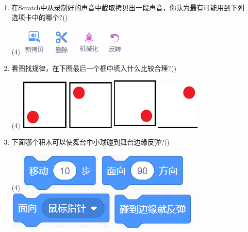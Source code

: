 \documentclass[10pt, a4paper]{article}
\begin{document}
\begin{enumerate}
        \item 在Scratch中从录制好的声音中截取拷贝出一段声音，你认为最有可能用到下列选项卡中的哪个?(\qquad)
        \begin{tasks}(4)
            \task \includegraphics[width=.04\textwidth]{21a.png}
            \task \includegraphics[width=.04\textwidth]{21b.png}
            \task \includegraphics[width=.04\textwidth]{21c.png}
            \task \includegraphics[width=.04\textwidth]{21d.png}
        \end{tasks}

        \item 看图找规律，在下图最后一个框中填入什么比较合理?(\qquad)
        \begin{tasks}(4)
            \task \includegraphics[width=.05\textwidth]{22a.png}
            \task \includegraphics[width=.05\textwidth]{22b.png}
            \task \includegraphics[width=.05\textwidth]{22c.png}
            \task \includegraphics[width=.05\textwidth]{22d.png}
        \end{tasks}

        \item 下面哪个积木可以使舞台中小球碰到舞台边缘反弹?(\qquad)
        \begin{tasks}(4)
            \task \includegraphics[width=.1\textwidth]{23a.png}
            \task \includegraphics[width=.1\textwidth]{23b.png}
            \task \includegraphics[width=.12\textwidth]{23c.png}
            \task \includegraphics[width=.1\textwidth]{23d.png}
        \end{tasks}


\end{enumerate}
\end{document}
